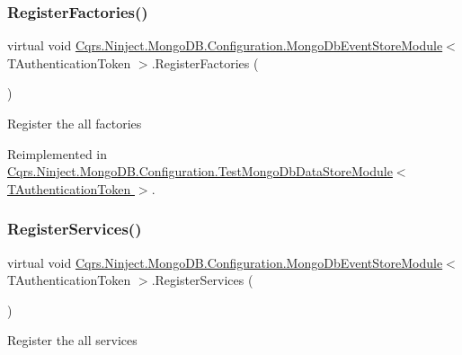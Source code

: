 \subsubsection{\texorpdfstring{Register\+Factories()}{RegisterFactories()}}
{\footnotesize\ttfamily virtual void \hyperlink{classCqrs_1_1Ninject_1_1MongoDB_1_1Configuration_1_1MongoDbEventStoreModule}{Cqrs.\+Ninject.\+Mongo\+D\+B.\+Configuration.\+Mongo\+Db\+Event\+Store\+Module}$<$ T\+Authentication\+Token $>$.Register\+Factories (\begin{DoxyParamCaption}{ }\end{DoxyParamCaption})\hspace{0.3cm}{\ttfamily [virtual]}}



Register the all factories 



Reimplemented in \hyperlink{classCqrs_1_1Ninject_1_1MongoDB_1_1Configuration_1_1TestMongoDbDataStoreModule_abff300412dc5c2602db5f51925204c6e}{Cqrs.\+Ninject.\+Mongo\+D\+B.\+Configuration.\+Test\+Mongo\+Db\+Data\+Store\+Module$<$ T\+Authentication\+Token $>$}.

\mbox{\label{classCqrs_1_1Ninject_1_1MongoDB_1_1Configuration_1_1MongoDbEventStoreModule_abbb71b43dadafb70410ef2ff491f5108}} 
\subsubsection{\texorpdfstring{Register\+Services()}{RegisterServices()}}
{\footnotesize\ttfamily virtual void \hyperlink{classCqrs_1_1Ninject_1_1MongoDB_1_1Configuration_1_1MongoDbEventStoreModule}{Cqrs.\+Ninject.\+Mongo\+D\+B.\+Configuration.\+Mongo\+Db\+Event\+Store\+Module}$<$ T\+Authentication\+Token $>$.Register\+Services (\begin{DoxyParamCaption}{ }\end{DoxyParamCaption})\hspace{0.3cm}{\ttfamily [virtual]}}



Register the all services 

